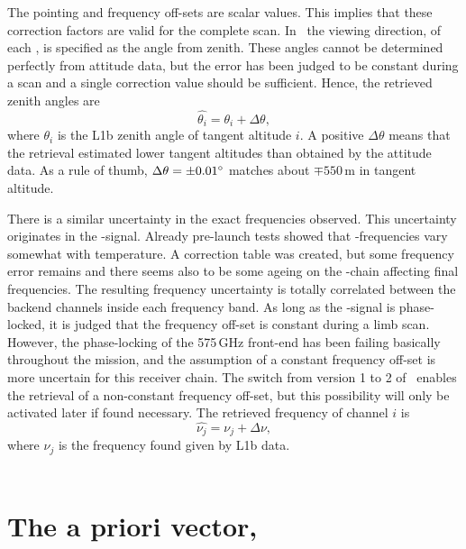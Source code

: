 The pointing and frequency off-sets are scalar values. This implies that these
correction factors are valid for the complete scan. In \ARTS\ the viewing
direction, of each \LOS, is specified as the angle from zenith. These angles
cannot be determined perfectly from attitude data, but the error has been
judged to be constant during a scan and a single correction value should be
sufficient. Hence, the retrieved zenith angles are
\begin{equation}
  \label{eq:retr:point}
  \hat{\theta_i} = \theta_i + \Delta\theta,  
\end{equation}
where $\theta_i$ is the L1b zenith angle of tangent altitude $i$. A positive 
$\Delta\theta$ means that the retrieval estimated lower tangent altitudes than
obtained by the attitude data. As a rule of thumb, $\Delta\theta=\pm0.01^\circ$
matches about $\mp550$\,m in tangent altitude.

There is a similar uncertainty in the exact frequencies observed. This
uncertainty originates in the \LO-signal. Already pre-launch tests showed that
\LO-frequencies vary somewhat with temperature. A correction table was created,
but some frequency error remains and there seems also to be some ageing on the
\LO-chain affecting final frequencies. The resulting frequency uncertainty is
totally correlated between the backend channels inside each frequency band. As
long as the \LO-signal is phase-locked, it is judged that the frequency off-set
is constant during a limb scan. However, the phase-locking of the
575\,GHz front-end has been failing basically throughout the mission, and the
assumption of a constant frequency off-set is more uncertain for this receiver
chain. The switch from version 1 to 2 of \ARTS\ enables the retrieval of a
non-constant frequency off-set, but this possibility will only be activated later
if found necessary. The retrieved frequency of channel $i$ is
\begin{equation}
  \label{eq:retr:freq}
  \hat{\nu_j} = \nu_j + \Delta\nu,  
\end{equation}
where $\nu_j$ is the frequency found given by L1b data.\\
\\


\section{The a priori vector, }
\label{sec:xa}
%

